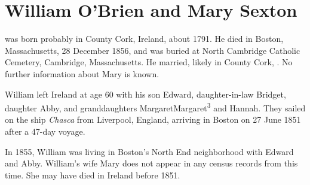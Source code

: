 \section{William O'Brien and Mary Sexton}\label{per:William1OBrien}

 was born probably in County Cork, Ireland, about 1791.\cite{Census1855William} He died in Boston, Massachusetts, 28 December 1856,\cite{William1OBrienDeath} and was buried at North Cambridge Catholic Cemetery, Cambridge, Massachusetts.\cite{DianaBerberenaLetter1} He married, likely in County Cork, .\cite{Michael2OBrienDeath,Abigail2OBrienDeath,Ann2OBrienDeath,Mary2OBrienDeath} No further information about Mary is known.

William left Ireland at age 60 with his son Edward, daughter-in-law Bridget, daughter Abby, and granddaughters MargaretMargaret\textsuperscript{3} and Hannah. They sailed on the ship \textit{Chasca}\cite{Chascay2} from Liverpool, England, arriving in Boston on 27 June 1851 after a 47-day voyage.\cite{Chascay}

In 1855, William was living in Boston's North End neighborhood with Edward and Abby.\cite{Census1855William,Wards} William's wife Mary does not appear in any census records from this time. She may have died in Ireland before 1851.

